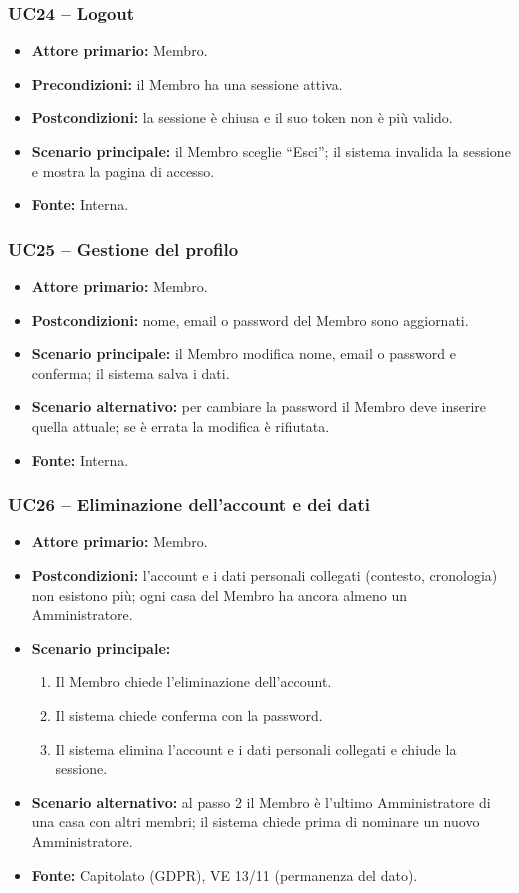 \documentclass[12pt,a4paper]{article}
\newcommand{\tightlist}{\setlength{\itemsep}{1pt}\setlength{\parskip}{0pt}}
\begin{document}
\subsubsection{UC24 -- Logout}
\begin{itemize}
\tightlist
\item \textbf{Attore primario:} Membro.
\item \textbf{Precondizioni:} il Membro ha una sessione attiva.
\item \textbf{Postcondizioni:} la sessione è chiusa e il suo token non è più valido.
\item \textbf{Scenario principale:} il Membro sceglie ``Esci''; il sistema invalida la sessione e mostra la pagina di accesso.
\item \textbf{Fonte:} Interna.
\end{itemize}

\subsubsection{UC25 -- Gestione del profilo}
\begin{itemize}
\tightlist
\item \textbf{Attore primario:} Membro.
\item \textbf{Postcondizioni:} nome, email o password del Membro sono aggiornati.
\item \textbf{Scenario principale:} il Membro modifica nome, email o password e conferma; il sistema salva i dati.
\item \textbf{Scenario alternativo:} per cambiare la password il Membro deve inserire quella attuale; se è errata la modifica è rifiutata.
\item \textbf{Fonte:} Interna.
\end{itemize}

\subsubsection{UC26 -- Eliminazione dell'account e dei dati}
\begin{itemize}
\tightlist
\item \textbf{Attore primario:} Membro.
\item \textbf{Postcondizioni:} l'account e i dati personali collegati (contesto, cronologia) non esistono più; ogni casa del Membro ha ancora almeno un Amministratore.
\item \textbf{Scenario principale:}
\begin{enumerate}
\tightlist
\item Il Membro chiede l'eliminazione dell'account.
\item Il sistema chiede conferma con la password.
\item Il sistema elimina l'account e i dati personali collegati e chiude la sessione.
\end{enumerate}
\item \textbf{Scenario alternativo:} al passo 2 il Membro è l'ultimo Amministratore di una casa con altri membri; il sistema chiede prima di nominare un nuovo Amministratore.
\item \textbf{Fonte:} Capitolato (GDPR), VE 13/11 (permanenza del dato).
\end{itemize}
\end{document}
